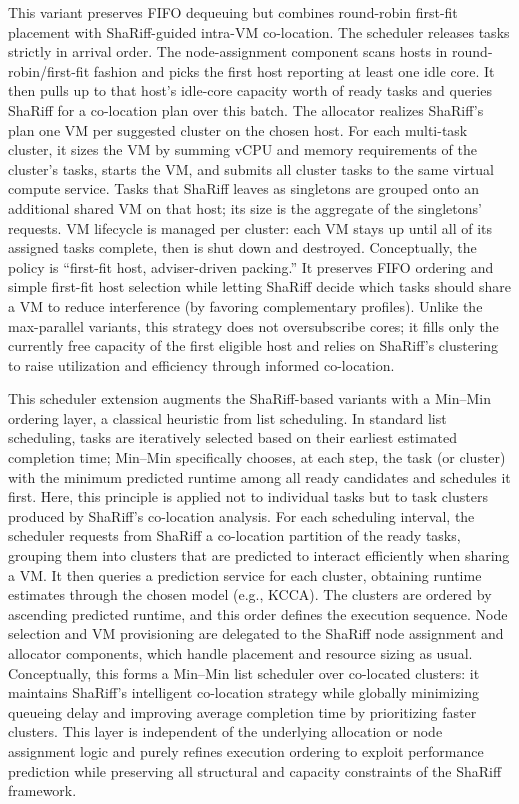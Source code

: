 This variant preserves FIFO dequeuing but combines round-robin first-fit placement with ShaRiff-guided intra-VM co-location. The scheduler releases tasks strictly in arrival order. The node-assignment component scans hosts in round-robin/first-fit fashion and picks the first host reporting at least one idle core. It then pulls up to that host’s idle-core capacity worth of ready tasks and queries ShaRiff for a co-location plan over this batch.
The allocator realizes ShaRiff’s plan one VM per suggested cluster on the chosen host. For each multi-task cluster, it sizes the VM by summing vCPU and memory requirements of the cluster’s tasks, starts the VM, and submits all cluster tasks to the same virtual compute service. Tasks that ShaRiff leaves as singletons are grouped onto an additional shared VM on that host; its size is the aggregate of the singletons’ requests. VM lifecycle is managed per cluster: each VM stays up until all of its assigned tasks complete, then is shut down and destroyed.
Conceptually, the policy is “first-fit host, adviser-driven packing.” It preserves FIFO ordering and simple first-fit host selection while letting ShaRiff decide which tasks should share a VM to reduce interference (by favoring complementary profiles). Unlike the max-parallel variants, this strategy does not oversubscribe cores; it fills only the currently free capacity of the first eligible host and relies on ShaRiff’s clustering to raise utilization and efficiency through informed co-location.

This scheduler extension augments the ShaRiff-based variants with a Min–Min ordering layer, a classical heuristic from list scheduling. In standard list scheduling, tasks are iteratively selected based on their earliest estimated completion time; Min–Min specifically chooses, at each step, the task (or cluster) with the minimum predicted runtime among all ready candidates and schedules it first. Here, this principle is applied not to individual tasks but to task clusters produced by ShaRiff’s co-location analysis.
For each scheduling interval, the scheduler requests from ShaRiff a co-location partition of the ready tasks, grouping them into clusters that are predicted to interact efficiently when sharing a VM. It then queries a prediction service for each cluster, obtaining runtime estimates through the chosen model (e.g., KCCA). The clusters are ordered by ascending predicted runtime, and this order defines the execution sequence. Node selection and VM provisioning are delegated to the ShaRiff node assignment and allocator components, which handle placement and resource sizing as usual.
Conceptually, this forms a Min–Min list scheduler over co-located clusters: it maintains ShaRiff’s intelligent co-location strategy while globally minimizing queueing delay and improving average completion time by prioritizing faster clusters. This layer is independent of the underlying allocation or node assignment logic and purely refines execution ordering to exploit performance prediction while preserving all structural and capacity constraints of the ShaRiff framework.